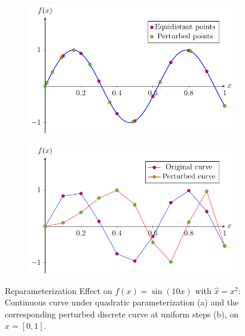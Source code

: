 \begin{figure}
    \centering
    \begin{subfigure}[b]{0.45\textwidth}
        \includegraphics[width=\textwidth]{figures/perturbation-function-parameterization-cont/fig.pdf}
        \caption{}
        \label{fig:perturbation-square-parameterization-cont}
    \end{subfigure}
    \hfill
    \begin{subfigure}[b]{0.45\textwidth}
        \includegraphics[width=\textwidth]{figures/perturbation-function-parameterization-disc/fig.pdf}
        \caption{}
        \label{fig:perturbation-square-parameterization-disc}
    \end{subfigure}
    \caption{Reparameterization Effect on \( f(x) = \sin(10x) \) with \( \hat{x} = x^2 \): Continuous curve under quadratic parameterization (a) and the corresponding perturbed discrete curve at uniform steps (b), on \( x = [0, 1] \).}
    \label{fig:perturbation-square-parameterization}
\end{figure}